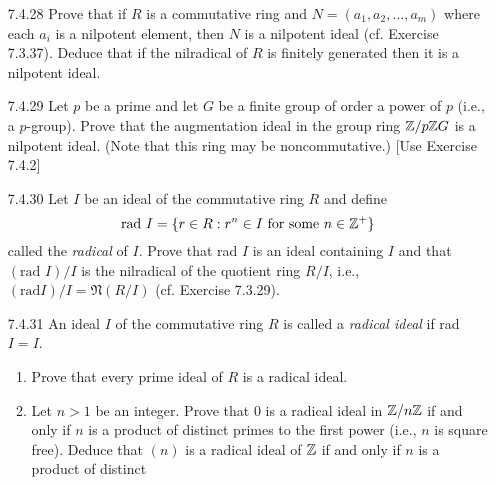 \begin{enumerate}
      \textbf{Proof.} Suppose that $a$ is a nilpotent element of $R$. Let
      $b \in R$. Then Exercise 7.1.14(b) says that $a(-b)$ is nilpotent in $R$.
      Thus $1 + a(-b) = 1 - ab$ is a unit in $R$ by Exercise 7.1.14(c). \qed
   \item[7.4.28]  Prove that if $R$ is a commutative ring and
                  $N = (a_1, a_2, \ldots, a_m)$ where each $a_i$ is a nilpotent
                  element, then $N$ is a nilpotent ideal (cf. Exercise 7.3.37).
                  Deduce that if the nilradical of $R$ is finitely generated
                  then it is a nilpotent ideal.
   \item[7.4.29]  Let $p$ be a prime and let $G$ be a finite group of order a
                  power of $p$ (i.e., a $p$-group). Prove that the augmentation
                  ideal in the group ring $\mathbb{Z}/p\mathbb{Z} G$ is a nilpotent ideal. (Note
                  that this ring may be noncommutative.) [Use Exercise 7.4.2]
   \item[7.4.30]  Let $I$ be an ideal of the commutative ring $R$ and define
                  $$\text{rad }I = \{r \in R : r^n \in I
                    \text{ for some }n \in \mathbb{Z}^+\}$$
                  called the \textit{radical} of $I$. Prove that rad $I$ is an
                  ideal containing $I$ and that $(\text{rad }I)/I$ is the
                  nilradical of the quotient ring $R/I$, i.e.,
                  $(\text{rad} I)/I = \mathfrak{N}(R/I)$ (cf. Exercise 7.3.29).
   \item[7.4.31]  An ideal $I$ of the commutative ring $R$ is called a
                  \textit{radical ideal} if rad $I = I$.
                  \begin{enumerate}
                     \item Prove that every prime ideal of $R$ is a radical
                           ideal.
                     \item Let $n > 1$ be an integer. Prove that 0 is a radical
                           ideal in $\mathbb{Z}/n\mathbb{Z}$ if and only if $n$ is a product of
                           distinct primes to the first power (i.e., $n$ is
                           square free). Deduce that $(n)$ is a radical ideal of
                           $\mathbb{Z}$ if and only if $n$ is a product of distinct

\end{enumerate}
\end{enumerate}

